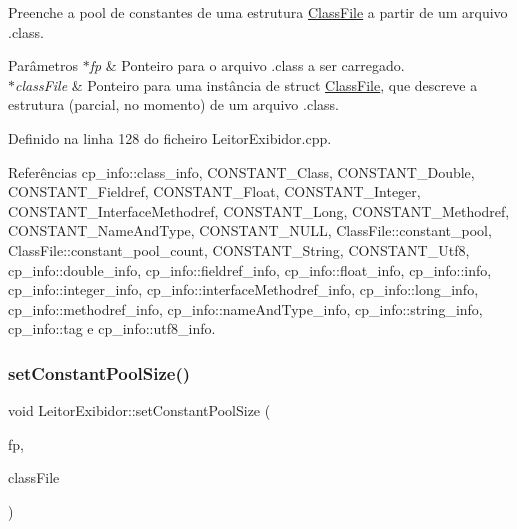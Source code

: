 Preenche a pool de constantes de uma estrutura \hyperlink{classClassFile}{Class\+File} a partir de um arquivo .class. 
\begin{DoxyParams}{Parâmetros}
{\em $\ast$fp} & Ponteiro para o arquivo .class a ser carregado. \\
\hline
{\em $\ast$class\+File} & Ponteiro para uma instância de struct \hyperlink{classClassFile}{Class\+File}, que descreve a estrutura (parcial, no momento) de um arquivo .class. \\
\hline
\end{DoxyParams}


Definido na linha 128 do ficheiro Leitor\+Exibidor.\+cpp.



Referências cp\+\_\+info\+::class\+\_\+info, C\+O\+N\+S\+T\+A\+N\+T\+\_\+\+Class, C\+O\+N\+S\+T\+A\+N\+T\+\_\+\+Double, C\+O\+N\+S\+T\+A\+N\+T\+\_\+\+Fieldref, C\+O\+N\+S\+T\+A\+N\+T\+\_\+\+Float, C\+O\+N\+S\+T\+A\+N\+T\+\_\+\+Integer, C\+O\+N\+S\+T\+A\+N\+T\+\_\+\+Interface\+Methodref, C\+O\+N\+S\+T\+A\+N\+T\+\_\+\+Long, C\+O\+N\+S\+T\+A\+N\+T\+\_\+\+Methodref, C\+O\+N\+S\+T\+A\+N\+T\+\_\+\+Name\+And\+Type, C\+O\+N\+S\+T\+A\+N\+T\+\_\+\+N\+U\+LL, Class\+File\+::constant\+\_\+pool, Class\+File\+::constant\+\_\+pool\+\_\+count, C\+O\+N\+S\+T\+A\+N\+T\+\_\+\+String, C\+O\+N\+S\+T\+A\+N\+T\+\_\+\+Utf8, cp\+\_\+info\+::double\+\_\+info, cp\+\_\+info\+::fieldref\+\_\+info, cp\+\_\+info\+::float\+\_\+info, cp\+\_\+info\+::info, cp\+\_\+info\+::integer\+\_\+info, cp\+\_\+info\+::interface\+Methodref\+\_\+info, cp\+\_\+info\+::long\+\_\+info, cp\+\_\+info\+::methodref\+\_\+info, cp\+\_\+info\+::name\+And\+Type\+\_\+info, cp\+\_\+info\+::string\+\_\+info, cp\+\_\+info\+::tag e cp\+\_\+info\+::utf8\+\_\+info.

\mbox{\label{classLeitorExibidor_a13b5c2cf5de57b6cea330a425f7e55be}} 
\subsubsection{\texorpdfstring{set\+Constant\+Pool\+Size()}{setConstantPoolSize()}}
{\footnotesize\ttfamily void Leitor\+Exibidor\+::set\+Constant\+Pool\+Size (\begin{DoxyParamCaption}\item[{F\+I\+LE $\ast$}]{fp,  }\item[{\hyperlink{classClassFile}{Class\+File} $\ast$}]{class\+File }\end{DoxyParamCaption})\hspace{0.3cm}{\ttfamily [private]}}

